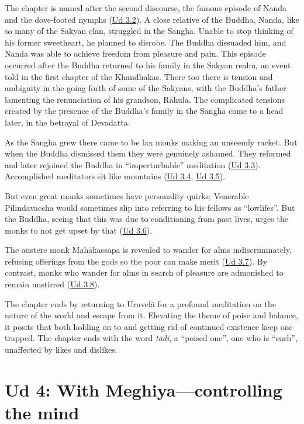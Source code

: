 \documentclass[12pt,openany]{book}%
\begin{document}
The chapter is named after the second discourse, the famous episode of Nanda and the dove-footed nymphs (\href{https://suttacentral.net/ud3.2/en/sujato}{Ud 3.2}). A close relative of the Buddha, Nanda, like so many of the Sakyan clan, struggled in the Sangha. Unable to stop thinking of his former sweetheart, he planned to disrobe. The Buddha dissuaded him, and Nanda was able to achieve freedom from pleasure and pain. This episode occurred after the Buddha returned to his family in the Sakyan realm, an event told in the first chapter of the Khandhakas. There too there is tension and ambiguity in the going forth of some of the Sakyans, with the Buddha’s father lamenting the renunciation of his grandson, \textsanskrit{Rāhula}. The complicated tensions created by the presence of the Buddha’s family in the Sangha come to a head later, in the betrayal of Devadatta.

As the Sangha grew there came to be lax monks making an unseemly racket. But when the Buddha dismissed them they were genuinely ashamed. They reformed and later rejoined the Buddha in “imperturbable” meditation (\href{https://suttacentral.net/ud3.3/en/sujato}{Ud 3.3}). Accomplished meditators sit like mountains (\href{https://suttacentral.net/ud3.4/en/sujato}{Ud 3.4}, \href{https://suttacentral.net/ud3.5/en/sujato}{Ud 3.5}). 

But even great monks sometimes have personality quirks; Venerable Pilindavaccha would sometimes slip into referring to his fellows as “lowlifes”. But the Buddha, seeing that this was due to conditioning from past lives,  urges the monks to not get upset by that (\href{https://suttacentral.net/ud3.6/en/sujato}{Ud 3.6}). 

The austere monk \textsanskrit{Mahākassapa} is revealed to wander for alms indiscriminately, refusing offerings from the gods so the poor can make merit (\href{https://suttacentral.net/ud3.7/en/sujato}{Ud 3.7}). By contrast, monks who wander for alms in search of pleasure are admonished to remain unstirred (\href{https://suttacentral.net/ud3.8/en/sujato}{Ud 3.8}). 

The chapter ends by returning to \textsanskrit{Uruvelā} for a profound meditation on the nature of the world and escape from it. Elevating the theme of poise and balance, it posits that both holding on to and getting rid of continued existence keep one trapped. The chapter ends with the word \textit{\textsanskrit{tādi}}, a “poised one”, one who is “such”, unaffected by likes and dislikes. 

\section*{Ud 4: With Meghiya—controlling the mind}
\end{document}
